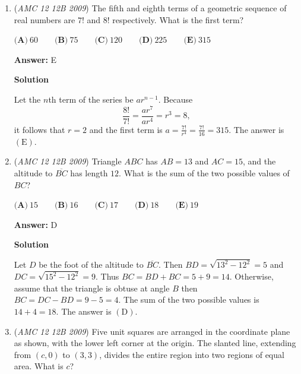 \begin{enumerate}
 

 \[-\left(\frac{3}{4}\right)^n+1>\frac{3}{4}\]

 \[\left(\frac{3}{4}\right)^n<\frac{1}{4}\]

 \[3^n<4^{n-1}\]

 \[n\ge5\]

 
Hence, the answer is $\boxed{\text{Friday}}$, or $\boxed{\text{(D)}}$.

 


	\item (\textit{AMC 12 12B 2009}) The fifth and eighth terms of a geometric sequence of real numbers are $7!$ and $8!$ respectively. What is the first term?


 $\textbf{(A)}\ 60\qquad \textbf{(B)}\ 75\qquad \textbf{(C)}\ 120\qquad \textbf{(D)}\ 225\qquad \textbf{(E)}\ 315$

 \textbf{Answer: }E



\textbf{Solution}

Let the $n$th term of the series be $ar^{n-1}$.  Because
 \[\frac {8!}{7!} = \frac {ar^7}{ar^4} = r^3 = 8,\]it follows that $r = 2$ and the first term is $a = \frac {7!}{r^4} = \frac {7!}{16} = \boxed{315}$.  The answer is $\mathrm{(E)}$.

 


	\item (\textit{AMC 12 12B 2009}) Triangle $ABC$ has $AB = 13$ and $AC = 15$, and the altitude to $\overline{BC}$ has length $12$. What is the sum of the two possible values of $BC$?


 $\textbf{(A)}\ 15\qquad \textbf{(B)}\ 16\qquad \textbf{(C)}\ 17\qquad \textbf{(D)}\ 18\qquad \textbf{(E)}\ 19$

 \textbf{Answer: }D



\textbf{Solution}

Let $D$ be the foot of the altitude to $\overline{BC}$.  Then $BD = \sqrt {13^2 - 12^2} = 5$ and $DC = \sqrt {15^2 - 12^2} = 9$.  Thus $BC = BD + BC = 5 + 9 = 14$. Otherwise, assume that the triangle is obtuse at angle $B$ then $BC = DC - BD = 9 -5 = 4$.  The sum of the two possible values is $14 + 4 = \boxed{18}$.  The answer is $\mathrm{(D)}$.

 


	\item (\textit{AMC 12 12B 2009}) Five unit squares are arranged in the coordinate plane as shown, with the lower left corner at the origin. The slanted line, extending from $(c,0)$ to $(3,3)$, divides the entire region into two regions of equal area. What is $c$?


\end{enumerate}
